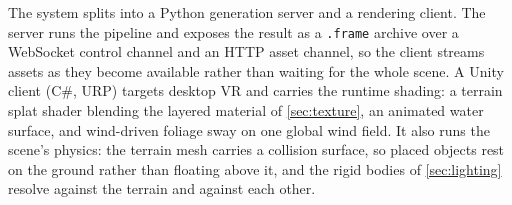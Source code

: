 The system splits into a Python generation server and a rendering client. The
server runs the pipeline and exposes the result as a \texttt{.frame} archive over a
WebSocket control channel and an HTTP asset channel, so the client streams assets
as they become available rather than waiting for the whole scene. A Unity client
(C\#, URP) targets desktop VR and carries the runtime shading: a terrain splat
shader blending the layered material of \cref{sec:texture}, an animated water
surface, and wind-driven foliage sway on one global wind field. It also runs the
scene's physics: the terrain mesh carries a collision surface, so placed objects
rest on the ground rather than floating above it, and the rigid bodies of
\cref{sec:lighting} resolve against the terrain and against each other.
